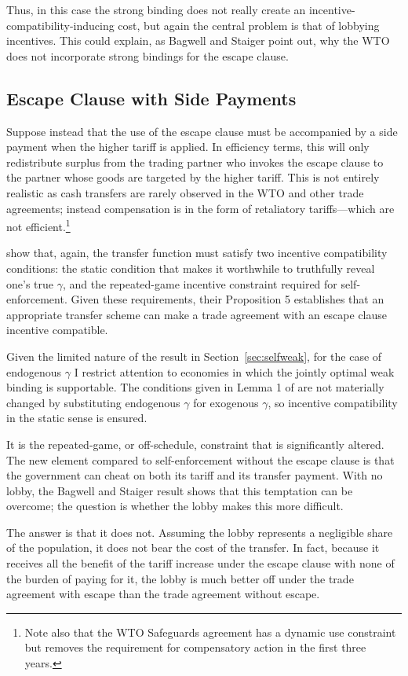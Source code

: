 \documentclass[12pt]{article}
\newcommand{\ga}{\gamma}
\begin{document}
Thus, in this case the strong binding does not really create an incentive-compatibility-inducing cost, but again the central problem is that of lobbying incentives. This could explain, as Bagwell and Staiger point out, why the WTO does not incorporate strong bindings for the escape clause.

\subsection{Escape Clause with Side Payments}
Suppose instead that the use of the escape clause must be accompanied by a side payment when the higher tariff is applied. In efficiency terms, this will only redistribute surplus from the trading partner who invokes the escape clause to the partner whose goods are targeted by the higher tariff. This is not entirely realistic as cash transfers are rarely observed in the WTO and other trade agreements; instead compensation is in the form of retaliatory tariffs---which are not efficient.\footnote{Note also that the WTO Safeguards agreement has a dynamic use constraint but removes the requirement for compensatory action in the first three years.}

\Textcite{bs2005} show that, again, the transfer function must satisfy two incentive compatibility conditions: the static condition that makes it worthwhile to truthfully reveal one's true $\ga$, and the repeated-game incentive constraint required for self-enforcement. Given these requirements, their Proposition 5 establishes that an appropriate transfer scheme can make a trade agreement with an escape clause incentive compatible.

Given the limited nature of the result in Section~\ref{sec:selfweak}, for the case of endogenous $\ga$ I restrict attention to economies in which the jointly optimal weak binding is supportable. The conditions given in Lemma 1 of \Textcite{bs2005} are not materially changed by substituting endogenous $\ga$ for exogenous $\ga$, so incentive compatibility in the static sense is ensured.

It is the repeated-game, or off-schedule, constraint that is significantly altered. The new element compared to self-enforcement without the escape clause is that the government can cheat on both its tariff and its transfer payment. With no lobby, the Bagwell and Staiger result shows that this temptation can be overcome; the question is whether the lobby makes this more difficult.

The answer is that it does not. Assuming the lobby represents a negligible share of the population, it does not bear the cost of the transfer. In fact, because it receives all the benefit of the tariff increase under the escape clause with none of the burden of paying for it, the lobby is much better off under the trade agreement with escape than the trade agreement without escape.
\end{document}
